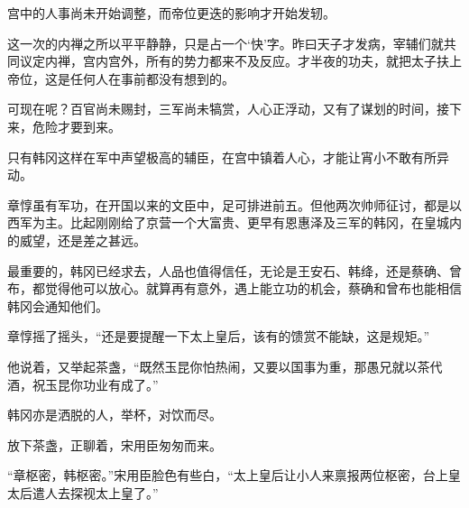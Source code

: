 宫中的人事尚未开始调整，而帝位更迭的影响才开始发轫。

这一次的内禅之所以平平静静，只是占一个‘快’字。昨曰天子才发病，宰辅们就共同议定内禅，宫内宫外，所有的势力都来不及反应。才半夜的功夫，就把太子扶上帝位，这是任何人在事前都没有想到的。

可现在呢？百官尚未赐封，三军尚未犒赏，人心正浮动，又有了谋划的时间，接下来，危险才要到来。

只有韩冈这样在军中声望极高的辅臣，在宫中镇着人心，才能让宵小不敢有所异动。

章惇虽有军功，在开国以来的文臣中，足可排进前五。但他两次帅师征讨，都是以西军为主。比起刚刚给了京营一个大富贵、更早有恩惠泽及三军的韩冈，在皇城内的威望，还是差之甚远。

最重要的，韩冈已经求去，人品也值得信任，无论是王安石、韩绛，还是蔡确、曾布，都觉得他可以放心。就算再有意外，遇上能立功的机会，蔡确和曾布也能相信韩冈会通知他们。

章惇摇了摇头，“还是要提醒一下太上皇后，该有的馈赏不能缺，这是规矩。”

他说着，又举起茶盏，“既然玉昆你怕热闹，又要以国事为重，那愚兄就以茶代酒，祝玉昆你功业有成了。”

韩冈亦是洒脱的人，举杯，对饮而尽。

放下茶盏，正聊着，宋用臣匆匆而来。

“章枢密，韩枢密。”宋用臣脸色有些白，“太上皇后让小人来禀报两位枢密，台上皇太后遣人去探视太上皇了。”

